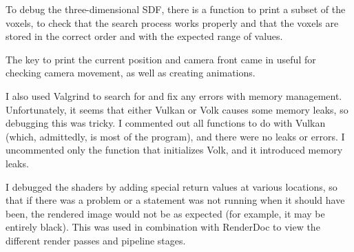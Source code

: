 To debug the three-dimensional SDF, there is a function to print a subset of the voxels, to check that the search process works properly and that the voxels are stored in the correct order and with the expected range of values.\newline

The key to print the current position and camera front came in useful for checking camera movement, as well as creating animations.\newline

I also used Valgrind to search for and fix any errors with memory management. Unfortunately, it seems that either Vulkan or Volk causes some memory leaks, so debugging this was tricky. I commented out all functions to do with Vulkan (which, admittedly, is most of the program), and there were no leaks or errors. I uncommented only the function that initializes Volk, and it introduced memory leaks.\newline

I debugged the shaders by adding special return values at various locations, so that if there was a problem or a statement was not running when it should have been, the rendered image would not be as expected (for example, it may be entirely black). This was used in combination with RenderDoc to view the different render passes and pipeline stages.